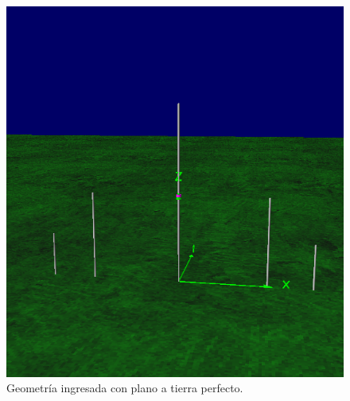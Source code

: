 
\begin{figure}[H]
	\centering
	\includegraphics[scale=0.4]{imagenes/2_geometria_tierra.png}
	\caption{Geometría ingresada con plano a tierra perfecto.}
	\label{fig.geometria_tierra}
\end{figure}


